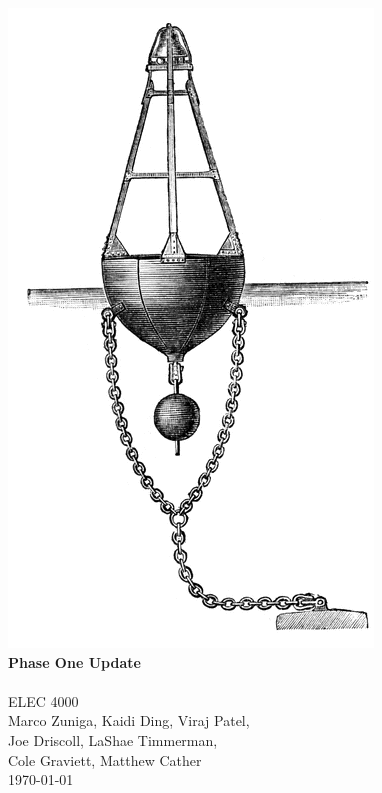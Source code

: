 \begin{titlepage}
	\begin{center}
		\includegraphics[scale=0.45]{graphics/browns_buoy.png}
		\HRule \\[0.4cm]
		{ \huge \bfseries \juicy Phase One Update \\[0.4cm] }
		\HRule \\[1.3cm]

		{\large ELEC 4000}\\[.4cm]
		{\large Marco Zuniga, Kaidi Ding, Viraj Patel,} \\ 
		{\large Joe Driscoll, LaShae Timmerman, }\\
		{\large Cole Graviett, Matthew Cather }\\[.4cm]
		{\large \today}

		\vfill


\end{center}
\end{titlepage}
